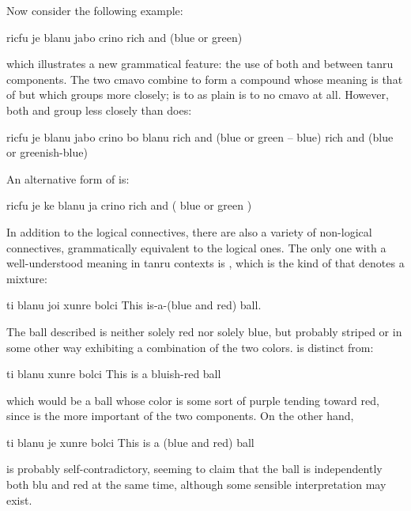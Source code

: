 Now consider the following example:
\begin{example}
ricfu je blanu jabo crino\n
rich and (blue or green)
\end{example}

{\noindent}which illustrates a new grammatical feature: the use of both
     and  between tanru components. The two cmavo
    combine to form a compound whose meaning is that of  but
    which groups more closely;  is to  as plain
     is to no cmavo at all. However, both  and 
    group less closely than  does:
\begin{example}
ricfu je blanu jabo crino bo blanu\n
rich and (blue or green -- blue)\n
rich and (blue or greenish-blue)
\end{example}

An alternative form of 
    is:
\begin{example}
ricfu je ke blanu ja crino \n
rich and ( blue or green )
\end{example}

In addition to the logical connectives, there are also a
    variety of non-logical connectives, grammatically equivalent to
    the logical ones. The only one with a well-understood meaning
    in tanru contexts is , which is the kind of  that
    denotes a mixture:
\begin{example}
ti blanu joi xunre bolci\n
This is-a-(blue and red) ball.
\end{example}

The ball described is neither solely red nor solely blue,
    but probably striped or in some other way exhibiting a
    combination of the two colors.  is distinct from:
\begin{example}
ti blanu xunre bolci\n
This is a bluish-red ball
\end{example}

{\noindent}which would be a ball whose color is some sort of purple
    tending toward red, since  is the more important of
    the two components. On the other hand,
\begin{example}
ti blanu je xunre bolci\n
This is a (blue and red) ball
\end{example}

{\noindent}is probably self-contradictory, seeming to claim that the ball
    is independently both blu and red at the same time, although
    some sensible interpretation may exist. 

